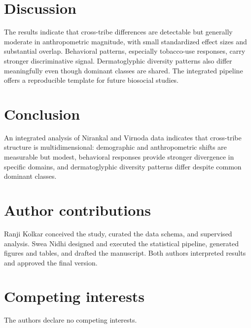 \documentclass[11pt]{article}
\begin{document}
\section{Discussion}
The results indicate that cross-tribe differences are detectable but generally moderate in anthropometric magnitude, with small standardized effect sizes and substantial overlap. Behavioral patterns, especially tobacco-use responses, carry stronger discriminative signal. Dermatoglyphic diversity patterns also differ meaningfully even though dominant classes are shared. The integrated pipeline offers a reproducible template for future biosocial studies.

\section{Conclusion}
An integrated analysis of Nirankal and Virnoda data indicates that cross-tribe structure is multidimensional: demographic and anthropometric shifts are measurable but modest, behavioral responses provide stronger divergence in specific domains, and dermatoglyphic diversity patterns differ despite common dominant classes.

\section{Author contributions}
Ranji Kolkar conceived the study, curated the data schema, and supervised analysis. Swea Nidhi designed and executed the statistical pipeline, generated figures and tables, and drafted the manuscript. Both authors interpreted results and approved the final version.

\section{Competing interests}
The authors declare no competing interests.



\end{document}
